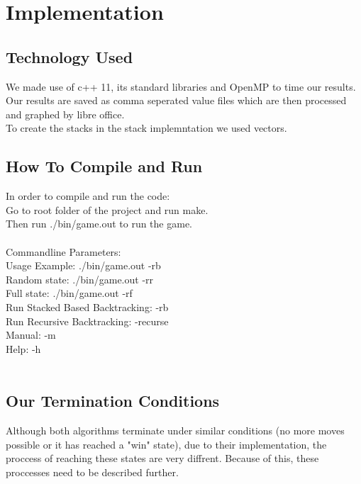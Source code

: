 \documentclass[a4paper]{article}
\begin{document}
\section{Implementation}

\subsection{Technology Used}
We made use of c++ 11, its standard libraries and OpenMP to time our results. Our results are saved as comma seperated value files which are then processed and graphed by libre office.\\
To create the stacks in the stack implemntation we used vectors.\\


\subsection{How To Compile and Run}
In order to compile and run the code:\\
Go to root folder of the project and run make.\\
Then run ./bin/game.out to run the game.
\\\\
Commandline Parameters:\\
Usage Example: ./bin/game.out -rb\\
Random state: ./bin/game.out -rr\\
Full state: ./bin/game.out -rf\\
Run Stacked Based Backtracking: -rb\\
Run Recursive Backtracking: -recurse\\
Manual: -m\\
Help: -h\\\


\subsection{Our Termination Conditions}
Although both algorithms terminate under similar conditions (no more moves possible or it has reached a "win" state), due to their implementation, the proccess of reaching these states are very diffrent. Because of this, these proccesses need to be described further.\\\
\end{document}
